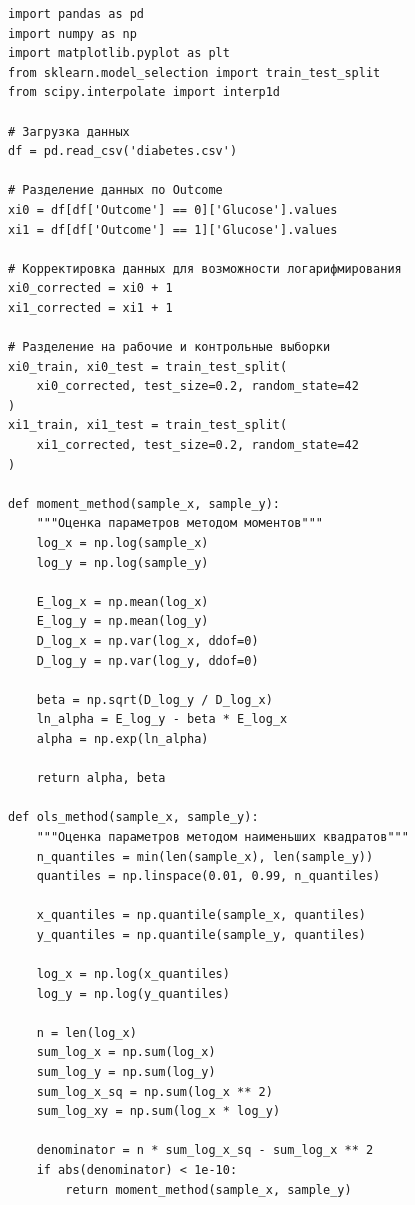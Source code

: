 \documentclass[a4paper, 14pt]{extarticle}
\begin{document}
\newenvironment{longlisting}{\captionsetup{type=listing}}{}
\begin{longlisting}
\caption{Основной модуль анализа зависимости между уровнями глюкозы}
\begin{verbatim}
import pandas as pd
import numpy as np
import matplotlib.pyplot as plt
from sklearn.model_selection import train_test_split
from scipy.interpolate import interp1d

# Загрузка данных
df = pd.read_csv('diabetes.csv')

# Разделение данных по Outcome
xi0 = df[df['Outcome'] == 0]['Glucose'].values
xi1 = df[df['Outcome'] == 1]['Glucose'].values

# Корректировка данных для возможности логарифмирования
xi0_corrected = xi0 + 1
xi1_corrected = xi1 + 1

# Разделение на рабочие и контрольные выборки
xi0_train, xi0_test = train_test_split(
    xi0_corrected, test_size=0.2, random_state=42
)
xi1_train, xi1_test = train_test_split(
    xi1_corrected, test_size=0.2, random_state=42
)

def moment_method(sample_x, sample_y):
    """Оценка параметров методом моментов"""
    log_x = np.log(sample_x)
    log_y = np.log(sample_y)
    
    E_log_x = np.mean(log_x)
    E_log_y = np.mean(log_y)
    D_log_x = np.var(log_x, ddof=0)
    D_log_y = np.var(log_y, ddof=0)
    
    beta = np.sqrt(D_log_y / D_log_x)
    ln_alpha = E_log_y - beta * E_log_x
    alpha = np.exp(ln_alpha)
    
    return alpha, beta

def ols_method(sample_x, sample_y):
    """Оценка параметров методом наименьших квадратов"""
    n_quantiles = min(len(sample_x), len(sample_y))
    quantiles = np.linspace(0.01, 0.99, n_quantiles)
    
    x_quantiles = np.quantile(sample_x, quantiles)
    y_quantiles = np.quantile(sample_y, quantiles)
    
    log_x = np.log(x_quantiles)
    log_y = np.log(y_quantiles)
    
    n = len(log_x)
    sum_log_x = np.sum(log_x)
    sum_log_y = np.sum(log_y)
    sum_log_x_sq = np.sum(log_x ** 2)
    sum_log_xy = np.sum(log_x * log_y)
    
    denominator = n * sum_log_x_sq - sum_log_x ** 2
    if abs(denominator) < 1e-10:
        return moment_method(sample_x, sample_y)
    

\end{verbatim}
\end{longlisting}
\end{document}
